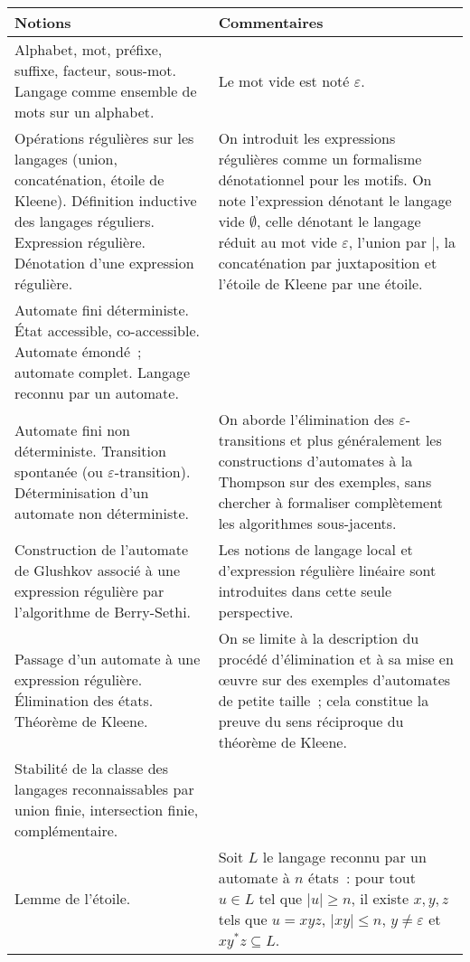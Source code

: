 \noindent
\begin{longtable}{|p{\lnotion}|p{\comment}|}
    \hline
    \textbf{Notions} & \textbf{Commentaires} \\
    \hline\hline
    Alphabet, mot, préfixe, suffixe, facteur, sous-mot. Langage comme ensemble de mots sur un alphabet.
    &
    Le mot vide est noté $\varepsilon$.
    \\ \hline
    Opérations régulières sur les langages (union, concaténation, étoile de Kleene). Définition inductive des langages réguliers. Expression régulière. Dénotation d'une expression régulière.
    &
    On introduit les expressions régulières comme un formalisme dénotationnel pour les motifs. On note l'expression dénotant le langage vide $\emptyset$, celle dénotant le langage réduit au mot vide $\varepsilon$, l'union par $|$, la concaténation par juxtaposition et l'étoile de Kleene par une étoile. 
    \\
    \hline 
    Automate fini déterministe. \'Etat accessible, co-accessible. Automate émondé~; automate complet. Langage reconnu par un automate.
    &
 \\
    \hline
     Automate fini non déterministe. Transition spontanée (ou $\varepsilon$-transition). Déterminisation d'un automate non déterministe. & On aborde l'élimination des $\varepsilon$-transitions et plus généralement les constructions d'automates à la Thompson sur des exemples, sans chercher à formaliser complètement les algorithmes sous-jacents.
    \\
    \hline
    Construction de l'automate de Glushkov associé à une expression régulière par l'algorithme de Berry-Sethi.
    &
    Les notions de langage local et d'expression régulière linéaire sont introduites dans cette seule perspective.
    \\ \hline
    Passage d'un automate à une expression régulière. Élimination des états. Théorème de Kleene.
    & On se limite à la description du procédé d'élimination et à sa mise en œuvre sur des exemples d'automates de petite taille~; cela constitue la preuve du sens réciproque du théorème de Kleene.
    \\ \hline
    Stabilité de la classe des langages reconnaissables par union finie, intersection finie, complémentaire. & \\ \hline
    Lemme de l'étoile. & Soit $L$ le langage reconnu par un automate à $n$ états~: pour tout $u\in L$ tel que $|u|\geq n$, il existe $x,y,z$ tels que $u=xyz$, $|xy|\leq n$, $y\neq\varepsilon$ et $xy^*z \subseteq L$.
    \\ \hline
\end{longtable}
